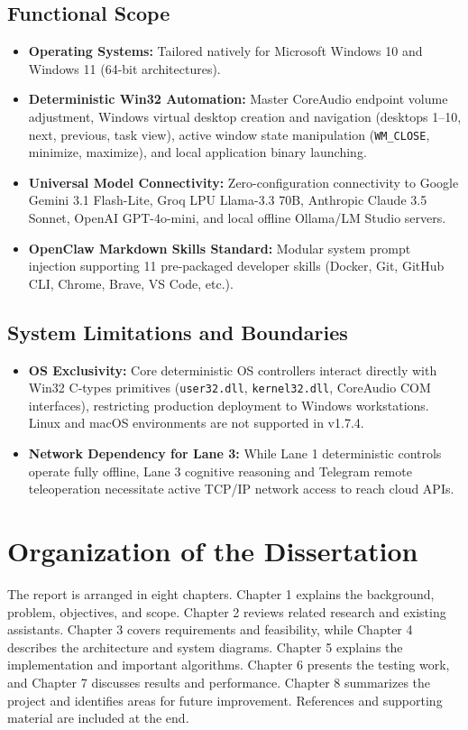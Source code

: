 \documentclass[12pt,letterpaper,oneside]{report}
\begin{document}
\subsection{Functional Scope}
\begin{itemize}
    \item \textbf{Operating Systems:} Tailored natively for Microsoft Windows 10 and Windows 11 (64-bit architectures).
    \item \textbf{Deterministic Win32 Automation:} Master CoreAudio endpoint volume adjustment, Windows virtual desktop creation and navigation (desktops 1–10, next, previous, task view), active window state manipulation (\texttt{WM\_CLOSE}, minimize, maximize), and local application binary launching.
    \item \textbf{Universal Model Connectivity:} Zero-configuration connectivity to Google Gemini 3.1 Flash-Lite, Groq LPU Llama-3.3 70B, Anthropic Claude 3.5 Sonnet, OpenAI GPT-4o-mini, and local offline Ollama/LM Studio servers.
    \item \textbf{OpenClaw Markdown Skills Standard:} Modular system prompt injection supporting 11 pre-packaged developer skills (Docker, Git, GitHub CLI, Chrome, Brave, VS Code, etc.).
\end{itemize}

\subsection{System Limitations and Boundaries}
\begin{itemize}
    \item \textbf{OS Exclusivity:} Core deterministic OS controllers interact directly with Win32 C-types primitives (\texttt{user32.dll}, \texttt{kernel32.dll}, CoreAudio COM interfaces), restricting production deployment to Windows workstations. Linux and macOS environments are not supported in v1.7.4.
    \item \textbf{Network Dependency for Lane 3:} While Lane 1 deterministic controls operate fully offline, Lane 3 cognitive reasoning and Telegram remote teleoperation necessitate active TCP/IP network access to reach cloud APIs.
\end{itemize}

\section{Organization of the Dissertation}
The report is arranged in eight chapters. Chapter 1 explains the background, problem, objectives, and scope. Chapter 2 reviews related research and existing assistants. Chapter 3 covers requirements and feasibility, while Chapter 4 describes the architecture and system diagrams. Chapter 5 explains the implementation and important algorithms. Chapter 6 presents the testing work, and Chapter 7 discusses results and performance. Chapter 8 summarizes the project and identifies areas for future improvement. References and supporting material are included at the end.
\end{document}
